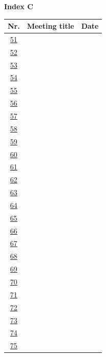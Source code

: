 \documentclass[aspectratio=43]{article}
\begin{document}
\newpage


\hypertarget{indexC}{}

{\normalsize\textbf{Index C}}

\begin{center}
	\begin{scriptsize}
		
		\renewcommand{\arraystretch}{2.15}
		
		\begin{tabular}{c|p{}|p{}}
			\textbf{Nr.} & \textbf{Meeting title} & \textbf{Date} \\
			\hline
			\hyperlink{p51}{51} & & \\ \hline
			\hyperlink{p52}{52} & & \\ \hline
			\hyperlink{p53}{53} & & \\ \hline
			\hyperlink{p54}{54} & & \\ \hline
			\hyperlink{p55}{55} & & \\ \hline
			\hyperlink{p56}{56} & & \\ \hline
			\hyperlink{p57}{57} & & \\ \hline
			\hyperlink{p58}{58} & & \\ \hline
			\hyperlink{p59}{59} & & \\ \hline
			\hyperlink{p60}{60} & & \\ \hline
			\hyperlink{p61}{61} & & \\ \hline
			\hyperlink{p62}{62} & & \\ \hline
			\hyperlink{p63}{63} & & \\ \hline
			\hyperlink{p64}{64} & & \\ \hline
			\hyperlink{p65}{65} & & \\ \hline
			\hyperlink{p66}{66} & & \\ \hline
			\hyperlink{p67}{67} & & \\ \hline
			\hyperlink{p68}{68} & & \\ \hline
			\hyperlink{p69}{69} & & \\ \hline
			\hyperlink{p70}{70} & & \\ \hline
			\hyperlink{p71}{71} & & \\ \hline
			\hyperlink{p72}{72} & & \\ \hline
			\hyperlink{p73}{73} & & \\ \hline
			\hyperlink{p74}{74} & & \\ \hline
			\hyperlink{p75}{75} & & \\ 
		\end{tabular}
		
	\end{scriptsize}
\end{center}
\end{document}

